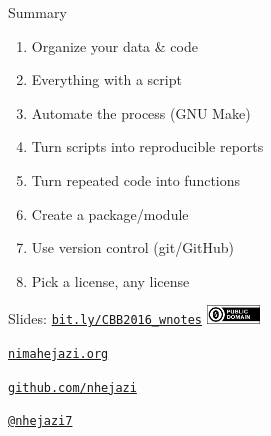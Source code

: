 \documentclass[12pt,t,handout]{beamer}
\begin{document}
\begin{frame}[c]{Summary}

  \begin{enumerate}
  \itemsep12pt
  \item Organize your data \& code
  \item Everything with a script
  \item Automate the process (GNU Make)
  \item Turn scripts into reproducible reports
  \item Turn repeated code into functions
  \item Create a package/module
  \item Use version control (git/GitHub)
  \item Pick a license, any license
  \end{enumerate}

\end{frame}


\begin{frame}[c]{}

\Large

Slides: \href{http://bit.ly/CBB2016_wnotes}{\tt bit.ly/CBB2016\_wnotes} \quad
\includegraphics[height=5mm]{Figs/cc-zero.png}

\vspace{10mm}

\href{http://nimahejazi.org}{\tt nimahejazi.org}

\vspace{10mm}

\href{https://github.com/nhejazi}{\tt github.com/nhejazi}

\vspace{10mm}

\href{https://twitter.com/nhejazi7}{\tt @nhejazi7}


\end{frame}
\end{document}
